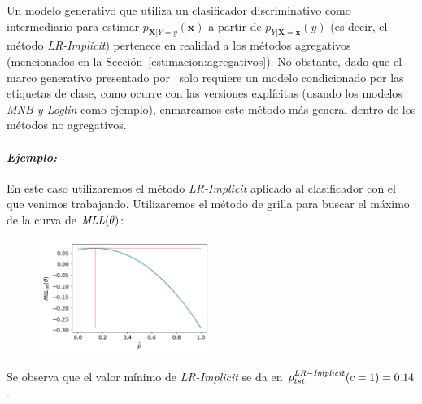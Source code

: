 Un modelo generativo que utiliza un clasificador discriminativo como
intermediario para estimar \(p_{\boldsymbol{X}|Y=y}(\boldsymbol{x})\) a partir
de \(p_{Y|\boldsymbol{X}=\boldsymbol{x}}(y)\) (es decir, el método {\it
LR-Implicit\/}) pertenece en realidad a los métodos agregativos (mencionados en
la Sección~\ref{estimacion:agregativos}). No obstante, dado que el marco
generativo presentado por~\citet{keith2018uncertainty} solo requiere un modelo
condicionado por las etiquetas de clase, como ocurre con las versiones
explícitas (usando los modelos {\it MNB\/ y \it Loglin\/} como ejemplo),
enmarcamos este método más general dentro de los métodos no agregativos.

\paragraph{\it Ejemplo:\/} En este caso utilizaremos el método {\it LR-Implicit}
aplicado al clasificador con el que venimos trabajando. Utilizaremos el método
de grilla para buscar el máximo de la curva de \({\it MLL\/}(\theta)\):
\begin{figure}[H]
    \centerline{\includegraphics[width=0.5\textwidth]{../plots_teoria/lr_implicit.png}}
    \caption{}\label{fig:lr_implicit}
\end{figure}

Se observa que el valor mínimo de {\it LR-Implicit} se da en \(p^{\it
LR-Implicit \/}_{tst}(c=1) = 0.14\).
